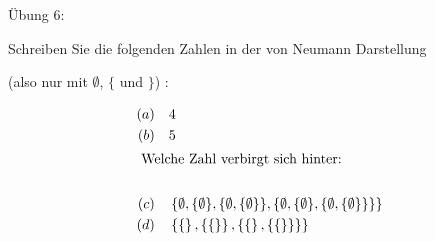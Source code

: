 \documentclass[12pt,ngerman,a4paper,ignorenonframetext,]{beamer}
\providecommand{\tightlist}{%
  \setlength{\itemsep}{0pt}\setlength{\parskip}{0pt}}
\begin{document}
\begin{frame}{Übung 6:}
\protect\hypertarget{ubung-6}{}

Schreiben Sie die folgenden Zahlen in der von Neumann Darstellung

(also nur mit \(\emptyset\), \(\{\) und \(\}\)) :

\begin{align*}
    (a) & \quad 4 \\
    (b) & \quad 5 \\
    \intertext{ Welche Zahl verbirgt sich hinter: } \\
    (c) & \quad \left\{ \emptyset, \{ \emptyset \}, \{ \emptyset, \{ \emptyset \} \}, \{ \emptyset, \{ \emptyset \}, \{ \emptyset, \{ \emptyset \} \}\} \right\} \\
    (d) & \quad \left\{ \left\{ \right\}, \left\{ \left\{ \right\} \right\}, \left\{ \left\{ \right\}, \left\{ \left\{ \right\} \right\} \right\} \right\}
\end{align*}

\note{\begin{enumerate}
[a)]
\tightlist
\item
  \(4 = \{ \emptyset, \{ \emptyset \}, \{ \emptyset, \{ \emptyset \} \}, \{ \emptyset, \{ \emptyset \}, \{ \emptyset, \{ \emptyset \} \} \} \}\)
\item
  \(5 = \{ \emptyset, \{ \emptyset \}, \{ \emptyset, \{ \emptyset \} \}, \{ \emptyset, \{ \emptyset \}, \{ \emptyset, \{ \emptyset \} \} \}, \{ \emptyset, \{ \emptyset \}, \{ \emptyset, \{ \emptyset \} \}, \{ \emptyset, \{ \emptyset \}, \{ \emptyset, \{ \emptyset \} \} \} \} \}\)
\item
  \(4\)
\item
  \(3\)
\end{enumerate}}

\end{frame}
\end{document}

